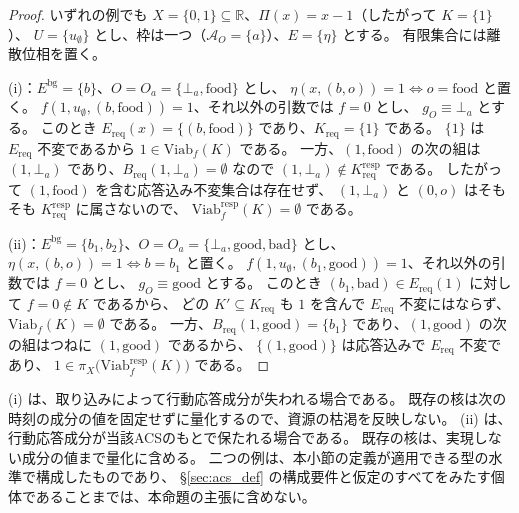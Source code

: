 \begin{proof}
いずれの例でも $X=\{0,1\}\subseteq\mathbb R$、$\Pi(x)=x-1$（したがって $K=\{1\}$）、
$U=\{u_{\emptyset}\}$ とし、枠は一つ（$\mathcal A_O=\{a\}$）、$E=\{\eta\}$ とする。
有限集合には離散位相を置く。

(i)：$E^{\mathrm{bg}}=\{b\}$、$O=O_a=\{\bot_a,\mathrm{food}\}$ とし、
$\eta(x,(b,o))=1\iff o=\mathrm{food}$ と置く。
$f(1,u_{\emptyset},(b,\mathrm{food}))=1$、それ以外の引数では $f=0$ とし、
$g_O\equiv\bot_a$ とする。
このとき $E_{\mathrm{req}}(x)=\{(b,\mathrm{food})\}$ であり、$K_{\mathrm{req}}=\{1\}$ である。
$\{1\}$ は $E_{\mathrm{req}}$ 不変であるから $1\in\mathrm{Viab}_f(K)$ である。
一方、$(1,\mathrm{food})$ の次の組は $(1,\bot_a)$ であり、$B_{\mathrm{req}}(1,\bot_a)=\emptyset$ なので
$(1,\bot_a)\notin K_{\mathrm{req}}^{\mathrm{resp}}$ である。
したがって $(1,\mathrm{food})$ を含む応答込み不変集合は存在せず、
$(1,\bot_a)$ と $(0,o)$ はそもそも $K_{\mathrm{req}}^{\mathrm{resp}}$ に属さないので、
$\mathrm{Viab}^{\mathrm{resp}}_f(K)=\emptyset$ である。

(ii)：$E^{\mathrm{bg}}=\{b_1,b_2\}$、$O=O_a=\{\bot_a,\mathrm{good},\mathrm{bad}\}$ とし、
$\eta(x,(b,o))=1\iff b=b_1$ と置く。
$f(1,u_{\emptyset},(b_1,\mathrm{good}))=1$、それ以外の引数では $f=0$ とし、
$g_O\equiv\mathrm{good}$ とする。
このとき $(b_1,\mathrm{bad})\in E_{\mathrm{req}}(1)$ に対して $f=0\notin K$ であるから、
どの $K'\subseteq K_{\mathrm{req}}$ も $1$ を含んで $E_{\mathrm{req}}$ 不変にはならず、
$\mathrm{Viab}_f(K)=\emptyset$ である。
一方、$B_{\mathrm{req}}(1,\mathrm{good})=\{b_1\}$ であり、$(1,\mathrm{good})$ の次の組はつねに $(1,\mathrm{good})$ であるから、
$\{(1,\mathrm{good})\}$ は応答込みで $E_{\mathrm{req}}$ 不変であり、
$1\in\pi_X\bigl(\mathrm{Viab}^{\mathrm{resp}}_f(K)\bigr)$ である。
\end{proof}

\begin{remark}[二つの例の読みと射程]
\label{rem:robust_noninclusion_reading}
(i) は、取り込みによって行動応答成分が失われる場合である。
既存の核は次の時刻の成分の値を固定せずに量化するので、資源の枯渇を反映しない。
(ii) は、行動応答成分が当該ACSのもとで保たれる場合である。
既存の核は、実現しない成分の値まで量化に含める。
二つの例は、本小節の定義が適用できる型の水準で構成したものであり、
\S\ref{sec:acs_def} の構成要件と仮定のすべてをみたす個体であることまでは、本命題の主張に含めない。
\end{remark}

